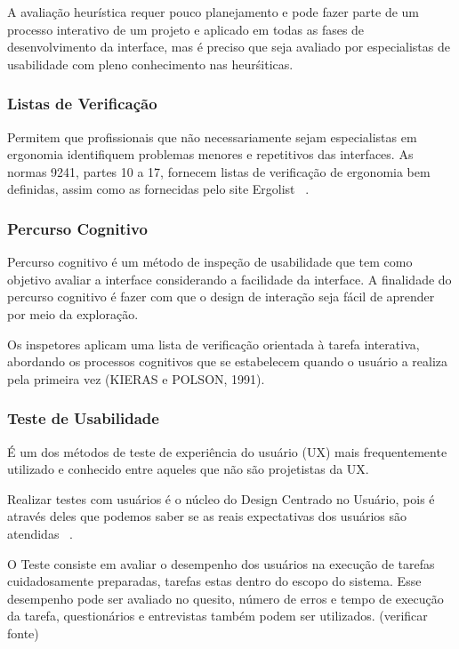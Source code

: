	A avaliação heurística requer pouco planejamento e pode fazer parte de um processo interativo de um projeto e aplicado em todas as fases de desenvolvimento da interface, mas é preciso que seja avaliado por especialistas de usabilidade com pleno conhecimento nas heurśiticas.
	

\subsubsection{Listas de Verificação}

	Permitem que profissionais que não necessariamente sejam especialistas em ergonomia identifiquem problemas menores e repetitivos das interfaces. As normas 9241, partes 10 a 17, fornecem listas de verificação de ergonomia bem definidas, assim como as fornecidas pelo site Ergolist ~\cite{cybis2010}.
	
	

\subsubsection{Percurso Cognitivo}

Percurso cognitivo é um método de inspeção de usabilidade que tem como objetivo avaliar a interface considerando a facilidade da interface. A finalidade do percurso cognitivo é fazer com que o design de interação seja fácil de aprender por meio da exploração.

Os inspetores aplicam uma lista de verificação orientada à tarefa interativa, abordando os processos cognitivos que se estabelecem quando o usuário a realiza pela primeira vez (KIERAS e POLSON, 1991).
	


\subsubsection{Teste de Usabilidade}

	É um dos métodos de teste de experiência do usuário (UX) mais frequentemente utilizado e conhecido entre aqueles que não são projetistas da UX.

	Realizar testes com usuários é o núcleo do Design Centrado no Usuário, pois é através deles que podemos saber se as reais expectativas dos usuários são atendidas ~\cite{santos2012}.

	O Teste consiste em avaliar o desempenho dos usuários na execução de tarefas cuidadosamente preparadas, tarefas estas dentro do escopo do sistema. Esse desempenho pode ser avaliado no quesito, número de erros e tempo de execução da tarefa, questionários e entrevistas também podem ser utilizados. (verificar fonte)

